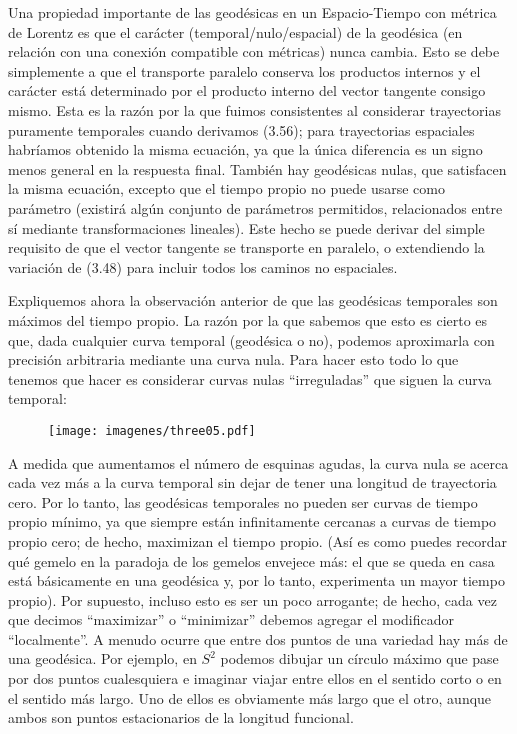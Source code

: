 \documentclass[11pt,b5paper,openany,twoside]{book}
\begin{document}
Una propiedad importante de las geodésicas en un Espacio-Tiempo con métrica de Lorentz es que el carácter (temporal/nulo/espacial) de la geodésica (en relación con una conexión compatible con métricas) nunca cambia.
Esto se debe simplemente a que el transporte paralelo conserva los productos internos y el carácter está determinado por el producto interno del vector tangente consigo mismo.
Esta es la razón por la que fuimos consistentes al considerar trayectorias puramente temporales cuando derivamos (3.56); para trayectorias espaciales habríamos obtenido la misma ecuación, ya que la única diferencia es un signo menos general en la respuesta final.
También hay geodésicas nulas, que satisfacen la misma ecuación, excepto que el tiempo propio no puede usarse como parámetro (existirá algún conjunto de parámetros permitidos, relacionados entre sí mediante transformaciones lineales).
Este hecho se puede derivar del simple requisito de que el vector tangente se transporte en paralelo, o extendiendo la variación de (3.48) para incluir todos los caminos no espaciales.

Expliquemos ahora la observación anterior de que las geodésicas temporales son máximos del tiempo propio.
La razón por la que sabemos que esto es cierto es que, dada cualquier curva temporal (geodésica o no), podemos aproximarla con precisión arbitraria mediante una curva nula.
Para hacer esto todo lo que tenemos que hacer es considerar curvas nulas ``irreguladas'' que siguen la curva temporal:

\begin{figure}[h]
\centering
\texttt{[image: imagenes/three05.pdf]}
\end{figure}

\noindent
A medida que aumentamos el número de esquinas agudas, la curva nula se acerca cada vez más a la curva temporal sin dejar de tener una longitud de trayectoria cero.
Por lo tanto, las geodésicas temporales no pueden ser curvas de tiempo propio mínimo, ya que siempre están infinitamente cercanas a curvas de tiempo propio cero; de hecho, maximizan el tiempo propio.
(Así es como puedes recordar qué gemelo en la paradoja de los gemelos envejece más: el que se queda en casa está básicamente en una geodésica y, por lo tanto, experimenta un mayor tiempo propio).
Por supuesto, incluso esto es ser un poco arrogante; de hecho, cada vez que decimos ``maximizar'' o ``minimizar'' debemos agregar el modificador ``localmente''. A menudo ocurre que entre dos puntos de una variedad hay más de una geodésica.
Por ejemplo, en $S^2$ podemos dibujar un círculo máximo que pase por dos puntos cualesquiera e imaginar viajar entre ellos en el sentido corto o en el sentido más largo.
Uno de ellos es obviamente más largo que el otro, aunque ambos son puntos estacionarios de la longitud funcional.
\end{document}
